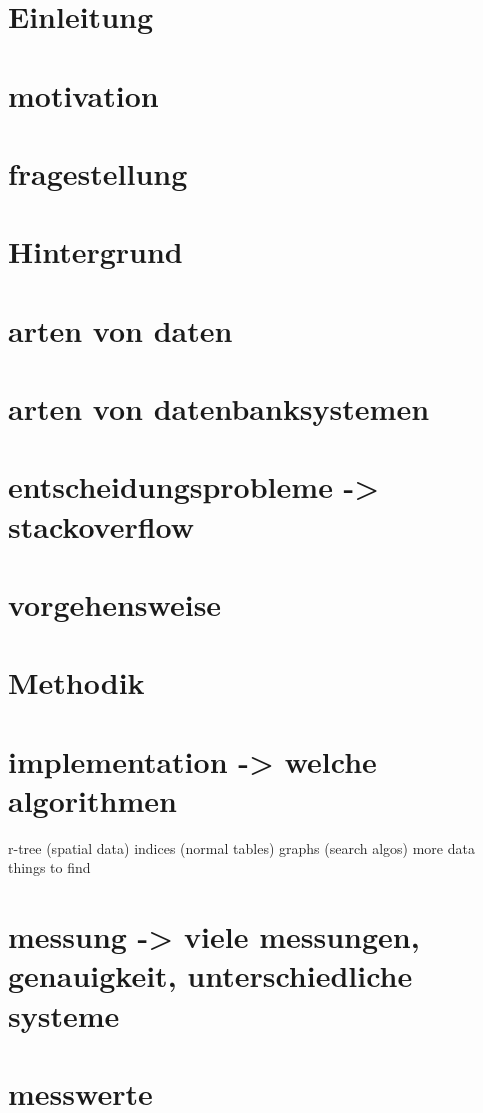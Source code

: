 
\section{Einleitung}
\section{motivation}
\section{fragestellung}

\section{Hintergrund}
\section{arten von daten}
\section{arten von datenbanksystemen}
\section{entscheidungsprobleme -> stackoverflow}
\section{vorgehensweise}

\section{Methodik}
\section{implementation -> welche algorithmen}

r-tree (spatial data)
indices (normal tables)
graphs (search algos)
more data things to find

\section{messung -> viele messungen, genauigkeit, unterschiedliche systeme}
\section{messwerte}

